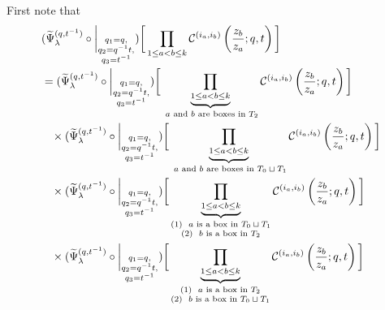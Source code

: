 \documentclass[12pt,reqno,a4paper]{amsart}
\newcommand{\comp}{\circ}
\newcommand{\cals}[1]{\mathcal{#1}}
\numberwithin{equation}{section}
\theoremstyle{definition}
\begin{document}
First note that 
\footnotesize
\begin{align}
	&(
	\widetilde{\Psi}_{\lambda}^{(q,t^{-1})}
	\comp 
	\bigg|_{
		\substack{
			q_1 = q, \\
			q_2 = q^{-1}t,\\
			q_3 = t^{-1} \\
		}
	}
	)
	\bigg[
	\prod_{1 \leq a < b \leq k}
	\cals{C}^{(i_a,i_b)}\left(
	\frac{z_b}{z_a}
	; q, t
	\right)
	\bigg]
	\label{eqn36-1108-15jul}
	\\
	&=
	(
	\widetilde{\Psi}_{\lambda}^{(q,t^{-1})}
	\comp 
	\bigg|_{
		\substack{
			q_1 = q, \\
			q_2 = q^{-1}t,\\
			q_3 = t^{-1} \\
		}
	}
	)
	\bigg[
	\underbrace{	\prod_{1 \leq a < b \leq k}				}_{\text{ $a$ and $b$ are boxes in $T_2$}}
	\cals{C}^{(i_a,i_b)}\left(
	\frac{z_b}{z_a}
	; q, t
	\right)
	\bigg]
	\label{eqn48-1512-25jul}
	\\
	&\hspace{0.3cm}\times 
	(
	\widetilde{\Psi}_{\lambda}^{(q,t^{-1})}
	\comp 
	\bigg|_{
		\substack{
			q_1 = q, \\
			q_2 = q^{-1}t,\\
			q_3 = t^{-1} \\
		}
	}
	)
	\bigg[
	\underbrace{	\prod_{1 \leq a < b \leq k}				}_{\text{ $a$ and $b$ are boxes in $T_0 \sqcup T_1$}}
	\cals{C}^{(i_a,i_b)}\left(
	\frac{z_b}{z_a}
	; q, t
	\right)
	\bigg]
	\label{eqn49-1512-25jul}
	\\
	&\hspace{0.3cm}\times 
	(
	\widetilde{\Psi}_{\lambda}^{(q,t^{-1})}
	\comp 
	\bigg|_{
		\substack{
			q_1 = q, \\
			q_2 = q^{-1}t,\\
			q_3 = t^{-1} \\
		}
	}
	)
	\bigg[
	\underbrace{	\prod_{1 \leq a < b \leq k}				}_{
		\substack{
			(1) \,\, \text{ $a$ is a box in $T_0 \sqcup T_1$}
			\\
			(2) \,\, \text{ $b$ is a box in $T_2$}
		}
	}
	\cals{C}^{(i_a,i_b)}\left(
	\frac{z_b}{z_a}
	; q, t
	\right)
	\bigg]
	\label{eqn310-1137-27jul}
	\\
	&\hspace{0.3cm}\times 
	(
	\widetilde{\Psi}_{\lambda}^{(q,t^{-1})}
	\comp 
	\bigg|_{
		\substack{
			q_1 = q, \\
			q_2 = q^{-1}t,\\
			q_3 = t^{-1} \\
		}
	}
	)
	\bigg[
	\underbrace{	\prod_{1 \leq a < b \leq k}				}_{
		\substack{
			(1) \,\, \text{ $a$ is a box in $T_2$}
			\\
			(2) \,\, \text{ $b$ is a box in $T_0 \sqcup T_1$}
		}
	}
	\cals{C}^{(i_a,i_b)}\left(
	\frac{z_b}{z_a}
	; q, t
	\right)
	\bigg]
	\label{eqn311-1137-27jul}
\end{align}
\normalsize
\end{document}
